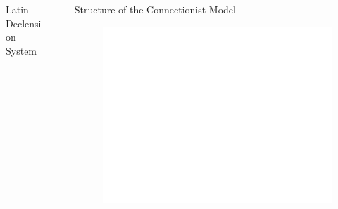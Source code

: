 \documentclass[final]{beamer}
\newlength{\sepwid}
\newlength{\onecolwid}
\newlength{\twocolwid}
\begin{document}
\begin{frame}[t]
\begin{columns}[t]
\begin{column}{\onecolwid}
\begin{block}{Latin Declension System}
\end{block}


\end{column} %

\begin{column}{\sepwid}\end{column} %

\begin{column}{\twocolwid} %


\begin{block}{Structure of the Connectionist Model}

\begin{figure}[t]
	\includegraphics[trim=0 140 0 0, clip, width=1\textwidth]{diagrams.pdf}
\end{figure}


\end{block}
\end{column}
\end{columns}
\end{frame}
\end{document}
